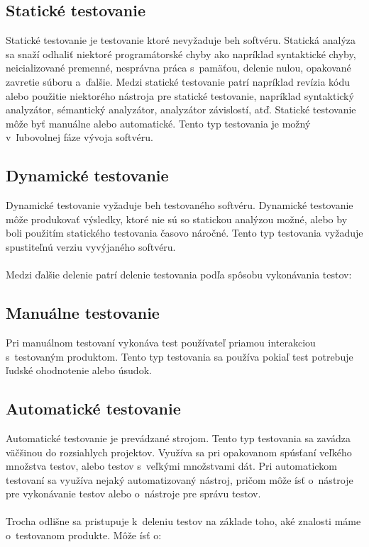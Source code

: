 \subsection*{Statické testovanie}
Statické testovanie je testovanie ktoré nevyžaduje beh softvéru. Statická analýza sa snaží odhaliť niektoré
programátorské chyby ako napríklad syntaktické chyby, neicializované premenné, nesprávna práca s~pamäťou, delenie nulou, opakované zavretie súboru a~ďalšie. 
Medzi statické testovanie patrí napríklad revízia kódu alebo použitie niektorého nástroja pre statické testovanie, napríklad syntaktický analyzátor, sémantický
analyzátor, analyzátor závislostí, atď. Statické testovanie môže byť manuálne alebo automatické. Tento typ testovania je možný v~ľubovolnej fáze vývoja softvéru.
\subsection*{Dynamické testovanie}
Dynamické testovanie vyžaduje beh testovaného softvéru. Dynamické testovanie môže produkovať výsledky, ktoré nie sú so statickou analýzou možné, alebo 
by boli použitím statického testovania časovo náročné. Tento typ testovania vyžaduje spustiteľnú verziu vyvýjaného softvéru.
\\
\\
Medzi ďalšie delenie patrí delenie testovania podľa spôsobu vykonávania testov:
\subsection*{Manuálne testovanie}
Pri manuálnom testovaní vykonáva test používateľ priamou interakciou s~testovaným produktom. 
Tento typ testovania sa používa pokiaľ test potrebuje ľudské ohodnotenie alebo úsudok.

\subsection*{Automatické testovanie}
Automatické testovanie je prevádzané strojom.
Tento typ testovania sa zavádza väčšinou do rozsiahlych projektov.
Využíva sa pri opakovanom spúsťaní veľkého množstva testov, alebo testov s~veľkými množstvami dát.
Pri automatickom testovaní sa využíva nejaký automatizovaný nástroj, pričom môže ísť o~nástroje 
pre vykonávanie testov alebo o~nástroje pre správu testov.
\\
\\
Trocha odlišne sa pristupuje k~deleniu testov na základe toho, aké znalosti máme o~testovanom produkte.
Môže ísť o:

